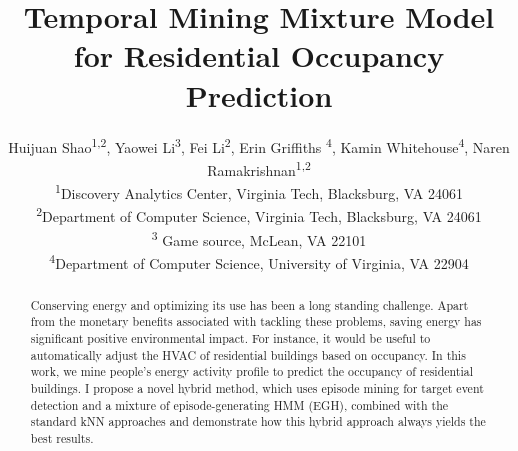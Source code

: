 \documentclass[sigconf]{acmart}
\begin{document}
\title{Temporal Mining Mixture Model for
Residential Occupancy Prediction}

\author{
  Huijuan Shao\textsuperscript{1,2}, Yaowei Li\textsuperscript{3}, Fei Li\textsuperscript{2}, Erin Griffiths \textsuperscript{4}, Kamin Whitehouse\textsuperscript{4}, Naren Ramakrishnan\textsuperscript{1,2} \\
  \textsuperscript{1}Discovery Analytics Center, Virginia Tech, Blacksburg, VA 24061 \\ %
  \textsuperscript{2}Department of Computer Science, Virginia Tech, Blacksburg, VA 24061 \\ %
    \textsuperscript{3} Game source, McLean, VA 22101 \\
  \textsuperscript{4}Department of Computer Science, University of Virginia, VA 22904 \\ %
}




\renewcommand{\shortauthors}{H. Shao et al.}


\begin{abstract}
Conserving energy and optimizing its use has been a long standing challenge. 
Apart from the monetary benefits associated with tackling these problems, saving energy has significant positive environmental impact. 
For instance, it would be useful to automatically adjust the HVAC of residential buildings based on occupancy.
In this work, we mine people's energy activity profile to predict the occupancy of residential buildings. I propose a novel hybrid method, which uses episode mining for target event  detection and a mixture of episode-generating HMM (EGH), 
combined with the standard kNN approaches and demonstrate how this hybrid approach always yields the best results.
\end{abstract}

%
%




\maketitle

%






%


 
\end{document}
